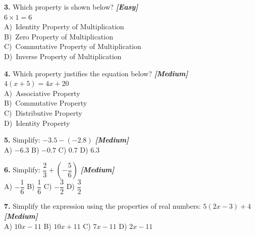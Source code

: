 \documentclass[11pt]{article}
\newcommand{\tageasy}{\textcolor{easy}{\textit{\textbf{[Easy]}}}}
\newcommand{\tagmedium}{\textcolor{medium}{\textit{\textbf{[Medium]}}}}
\begin{document}
\vspace{10pt}
\noindent\textbf{3.} Which property is shown below? \tageasy\\
\hspace*{1.5em}$6\times1=6$\\
\hspace*{1.5em}A)\ Identity Property of Multiplication\\
\hspace*{1.5em}B)\ Zero Property of Multiplication\\
\hspace*{1.5em}C)\ Commutative Property of Multiplication\\
\hspace*{1.5em}D)\ Inverse Property of Multiplication

\vspace{10pt}
\noindent\textbf{4.} Which property justifies the equation below? \tagmedium\\
\hspace*{1.5em}$4(x+5)=4x+20$\\
\hspace*{1.5em}A)\ Associative Property\\
\hspace*{1.5em}B)\ Commutative Property\\
\hspace*{1.5em}C)\ Distributive Property\\
\hspace*{1.5em}D)\ Identity Property

\vspace{10pt}
\noindent\textbf{5.} Simplify: $-3.5-(-2.8)$ \tagmedium\\
\hspace*{1.5em}A) $-6.3$ \quad B) $-0.7$ \quad C) $0.7$ \quad D) $6.3$

\vspace{10pt}
\noindent\textbf{6.} Simplify: $\dfrac{2}{3}+\left(-\dfrac{5}{6}\right)$ \tagmedium\\
\hspace*{1.5em}A) $-\dfrac{1}{6}$ \quad B) $\dfrac{1}{6}$ \quad C) $-\dfrac{3}{2}$ \quad D) $\dfrac{3}{2}$

\vspace{10pt}
\noindent\textbf{7.} Simplify the expression using the properties of real numbers: $5(2x-3)+4$ \tagmedium\\
\hspace*{1.5em}A) $10x-11$ \quad B) $10x+11$ \quad C) $7x-11$ \quad D) $2x-11$
\end{document}
